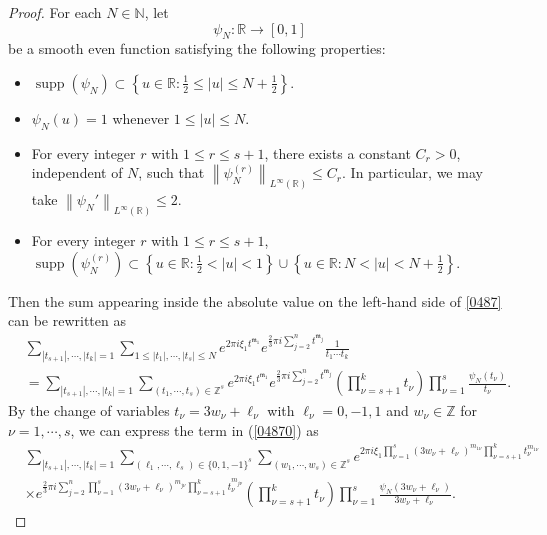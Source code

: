 \documentclass[11 pt,letterpaper]{amsart}
\theoremstyle{plain}
\theoremstyle{definition}
\theoremstyle{remark} \theoremstyle{exam} \theoremstyle{ob}
\numberwithin{equation}{section}
\begin{document}
\begin{proof}
For each $N\in\mathbb{N}$, let
\[
\psi_N:\mathbb{R}\to[0,1]
\]
be a smooth even function satisfying the following properties:
\begin{itemize}
	\item[(1)]
	$\operatorname{supp}(\psi_N)
	\subset
	\left\{
	u\in\mathbb{R}:
	\frac{1}{2}\leq |u|\leq N+\frac{1}{2}
	\right\}.$
	\item[(2)]
$\psi_N(u)=1$ whenever
	$1\leq |u|\leq N.$
	\item[(3)]
	For every integer $r$ with $1\leq r\leq s+1$, there exists
	a constant $C_r>0$, independent of $N$, such that
	$\left\|
	\psi_N^{(r)}
	\right\|_{L^\infty(\mathbb{R})}
	\leq C_r.$
	In particular, we may take
$\left\|
	\psi_N'
	\right\|_{L^\infty(\mathbb{R})}
	\leq 2.$
	\item[(4)]
	For every integer $r$ with $1\leq r\leq s+1$,
$\operatorname{supp}\!\left(\psi_N^{(r)}\right)
	\subset
	\left\{
	u\in\mathbb{R}:
	\frac{1}{2}<|u|<1
	\right\}
	\cup
	\left\{
	u\in\mathbb{R}:
	N<|u|<N+\frac{1}{2}
	\right\}.$
\end{itemize}
Then the sum appearing inside the absolute value on the left-hand side of \eqref{0487} can be rewritten as
\begin{align}\label{04870}
& \sum_{|t_{s+1}|,\cdots,|t_k|=1}\sum_{1\le |t_1|,\cdots,|t_s|\le N} e^{2\pi i \xi_1 t^{\mathfrak{m}_1}  } e^{\frac{2}{3}\pi i 
 \sum_{j=2}^n t^{\mathfrak{m}_j} } \frac{1}{t_1\cdots t_k}\nonumber \\
&= \sum_{|t_{s+1}|,\cdots,|t_k|=1}\sum_{(t_1,\cdots,t_s)\in \mathbb{Z}^s} e^{2\pi i \xi_1 t^{\mathfrak{m}_1}  } e^{\frac{2}{3}\pi i 
 \sum_{j=2}^n t^{\mathfrak{m}_j} }\left(\prod_{\nu=s+1}^k t_{\nu}\right) \prod_{\nu=1}^s\frac{\psi_N(t_\nu)}{t_\nu}. 
\end{align}
By the change of variables $t_\nu=3w_\nu+\ell_\nu$  with $\ell_\nu=0,-1,1$ and $w_\nu\in\mathbb{Z}$ for $\nu=1,\cdots,s$,   we can express the term in (\ref{04870}) as
\begin{align*}
& \sum_{|t_{s+1}|,\cdots,|t_k|=1}  \sum_{(\ell_1,\cdots,\ell_s)\in\{0,1,-1\}^s} \sum_{(w_1,\cdots,w_s)\in \mathbb{Z}^s} e^{2\pi i \xi_1  \prod_{\nu=1}^s(3w_\nu+\ell_\nu)^{m_{1\nu}} \prod_{\nu=s+1}^k t_\nu^{m_{1\nu}}  }\\
&\times e^{\frac{2}{3}\pi i 
 \sum_{j=2}^n \prod_{\nu=1}^s(3w_\nu+\ell_\nu)^{m_{j\nu}}
 \prod_{\nu=s+1}^k t_\nu^{m_{j\nu}} }\left(\prod_{\nu=s+1}^k t_{\nu} \right)\prod_{\nu=1}^s\frac{\psi_N(3w_\nu+\ell_\nu)}{3w_\nu+\ell_\nu}.
\end{align*}

\end{proof}
\end{document}
